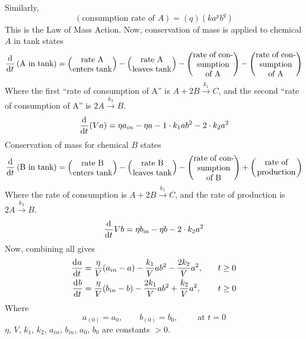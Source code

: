 \documentclass[12pt,twoside]{article}
\begin{document}
Similarly,
\begin{equation}
  \left(\text{consumption rate of }A\right) = (q)(ka^p b^q)
\end{equation}
This is the Law of Mass Action. Now, conservation of mass is applied to chemical
$A$ in tank states
\begin{equation}
  \begin{aligned}
    \od{}{t}\left(\text{A in tank}\right) = \left(\text{\parbox{5em}{\centering rate A enters tank}}\right) -
    \left(\text{\parbox{5em}{\centering rate A leaves tank}}\right) -
    \left(\text{\parbox{5em}{\centering rate of consumption of A}}\right) -
    \left(\text{\parbox{5em}{\centering rate of consumption of A}}\right)
  \end{aligned}
\end{equation}
Where the first ``rate of consumption of A'' is $A + 2B \xrightarrow{k_1} C$,
and the second ``rate of consumption of A'' is $2A \xrightarrow{k_2} B$.
\begin{equation}
  \begin{aligned}
    \frac{\mathrm{d}^{} {}}{\mathrm{d}{t}^{}}(Va) = \eta a_{in} - \eta a - 1\cdot k_1ab^2 - 2\cdot k_2a^2
  \end{aligned}
\end{equation}
Conservation of mass for chemical $B$ states
\begin{equation}
  \od{}{t}\left(\text{B in tank}\right) = \left(\text{\parbox{5em}{\centering rate B enters tank}}\right) -
  \left(\text{\parbox{5em}{\centering rate B leaves tank}}\right) -
  \left(\text{\parbox{5em}{\centering rate of consumption of B}}\right) +
  \left(\text{\parbox{5em}{\centering rate of production}}\right)
\end{equation}
Where the rate of consumption is $A + 2B \xrightarrow{k_1} C$, and the rate of
production is $2A \xrightarrow{k_2} B$.
\begin{equation}
  \frac{\mathrm{d}^{} {}}{\mathrm{d}{t}^{}}Vb = \eta b_{\text{in}} - \eta b - 2\cdot k_2a^2
\end{equation}
Now, combining all gives
\begin{equation}
  \begin{aligned}
    \frac{\mathrm{d}^{} {a}}{\mathrm{d}{t}^{}} &= \frac{\eta}{V}(a_{in}-a) - \frac{k_1}{V}ab^2 - \frac{2k_2}{V}a^2, &\quad t&\ge0 \\
    \frac{\mathrm{d}^{} {b}}{\mathrm{d}{t}^{}} &= \frac{\eta}{V}(b_{in}-b) - \frac{2k_1}{V}ab^2 + \frac{k_2}{V}a^2, &\quad t&\ge0 \\
  \end{aligned}
\end{equation}
Where
\begin{equation}
  a_{(0)}=a_0,\qquad b_{(0)}=b_0,\qquad \text{ at } t=0
\end{equation}
$\eta$, $V$, $k_1$, $k_2$, $a_{in}$, $b_{in}$, $a_0$, $b_0$ are constants $>0$.
\end{document}
